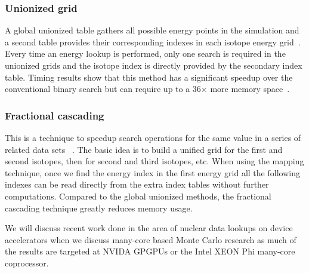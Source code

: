 \subsubsection*{ \textbf{Unionized grid} } A global unionized table gathers all possible energy points in the simulation and a second table provides their corresponding indexes in each isotope energy grid~\cite{leppanen2009two}. Every time an energy lookup is performed, only one search is required in the unionized grids and the isotope index is directly provided by the secondary index table. Timing results show that this method has a significant speedup over the conventional binary search but can require up to a 36$\times$ more memory space~\cite{a.l.lunda.r.siegel2015}.
%
\subsubsection*{ \textbf{Fractional cascading} } This is a technique to speedup search operations for the same value in a series of related data sets ~\cite{a.l.lunda.r.siegel2015}. The basic idea is to build a unified grid for the first and second isotopes, then for second and third isotopes, etc. When using the mapping technique, once we find the energy index in the first energy grid all the following indexes can be read directly from the extra index tables without further computations. Compared to the global unionized methods, the fractional cascading technique greatly reduces memory usage.

%
We will discuss recent work done in the area of nuclear data lookups on device accelerators when we discuss many-core based Monte Carlo research as much of the results are targeted at NVIDA GPGPUs or the Intel XEON Phi many-core coprocessor. 
